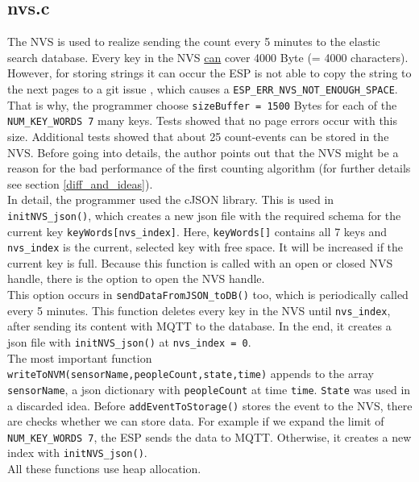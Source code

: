 \subsection{nvs.c}
The NVS is used to realize sending the count every 5 minutes to the elastic search database.
Every key in the NVS \underline{can} cover 4000 Byte (= 4000 characters). However, for storing
strings it can occur the ESP is not able to copy the string to the next pages to a git issue
\cite{gitPagesNVS}, which causes a \verb!ESP_ERR_NVS_NOT_ENOUGH_SPACE!. That is why, the programmer
choose \verb!sizeBuffer = 1500! Bytes for each of the \verb!NUM_KEY_WORDS 7! many keys. Tests showed
that no page errors occur with this size. Additional tests showed that about
25 count-events can be stored in the NVS.
Before going into details, the author points out that the NVS might be a reason for the bad performance of
the first counting algorithm (for further details see section \ref{diff_and_ideas}).\\
In detail, the programmer used the cJSON library. This is used in \verb!initNVS_json()!, which creates
a new json file with the required schema for the current key \verb!keyWords[nvs_index]!.
Here, \verb!keyWords[]! contains all
7 keys and \verb!nvs_index! is the current, selected key with free space. It will be increased if the current key
is full.
Because this function is called with an open
or closed NVS handle, there is the option to open the NVS handle.\\
This option occurs in \verb!sendDataFromJSON_toDB()! too, which is periodically called every 5 minutes.
This function deletes every key in the NVS until \verb!nvs_index!,
after sending its content with MQTT to the database. In the end, it creates a json file with
\verb!initNVS_json()! at \verb!nvs_index = 0!.\\
The most important function \verb!writeToNVM(sensorName,peopleCount,state,time)! appends to
the array \verb!sensorName!, a json dictionary with \verb!peopleCount! at time \verb!time!.
\verb!State! was used in a discarded idea. Before \verb!addEventToStorage()!
stores the event to the NVS, there are checks whether we can store data.
For example if we expand the limit of \verb!NUM_KEY_WORDS 7!,
the ESP sends the data to MQTT. Otherwise, it creates a new index with \verb!initNVS_json()!.\\
All these functions use heap allocation.


